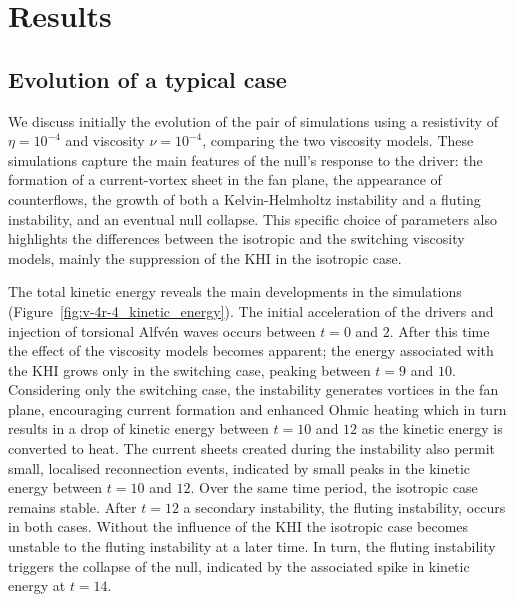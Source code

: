 \section{Results}

\subsection{Evolution of a typical case}
\label{sec:null_point_khi_single_case}

We discuss initially the evolution of the pair of simulations using a resistivity of $\eta = 10^{-4}$ and viscosity $\nu = 10^{-4}$, comparing the two viscosity models. These simulations capture the main features of the null's response to the driver: the formation of a current-vortex sheet in the fan plane, the appearance of counterflows, the growth of both a Kelvin-Helmholtz instability and a fluting instability, and an eventual null collapse. This specific choice of parameters also highlights the differences between the isotropic and the switching viscosity models, mainly the suppression of the KHI in the isotropic case.

The total kinetic energy reveals the main developments in the simulations (Figure~\ref{fig:v-4r-4_kinetic_energy}). The initial acceleration of the drivers and injection of torsional Alfv\'en waves occurs between $t=0$ and $2$. After this time the effect of the viscosity models becomes apparent; the energy associated with the KHI grows only in the switching case, peaking between $t=9$ and $10$. Considering only the switching case, the instability generates vortices in the fan plane, encouraging current formation and enhanced Ohmic heating which in turn results in a drop of kinetic energy between $t=10$ and $12$ as the kinetic energy is converted to heat. The current sheets created during the instability also permit small, localised reconnection events, indicated by small peaks in the kinetic energy between $t=10$ and $12$. Over the same time period, the isotropic case remains stable. After $t=12$ a secondary instability, the fluting instability, occurs in both cases. Without the influence of the KHI the isotropic case becomes unstable to the fluting instability at a later time. In turn, the fluting instability triggers the collapse of the null, indicated by the associated spike in kinetic energy at $t=14$.

